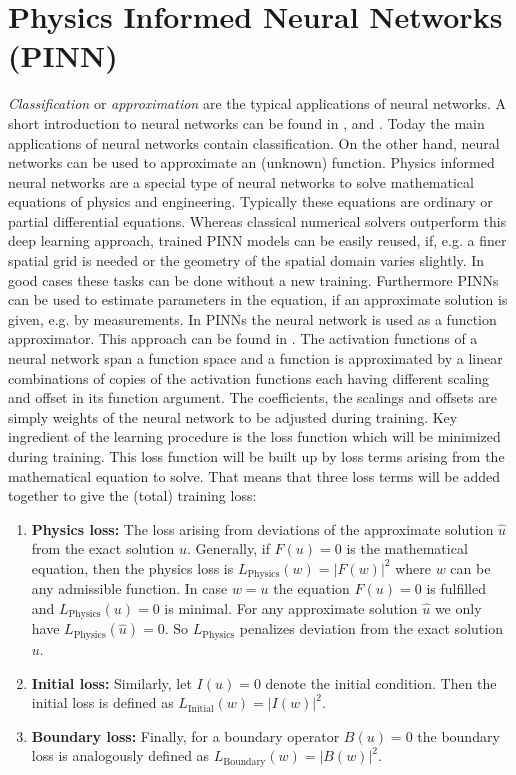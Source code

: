 \documentclass[a4paper,11pt]{article}
\begin{document}
\section{Physics Informed Neural Networks (PINN)}
\emph{Classification} or \emph{approximation} are the typical applications of neural networks. A short introduction to neural networks can be found in \cite[pp. 809]{stoecker1995formeln}, \cite{rey2011neuralnetworks} and \cite{rojas1993neuronale}. Today the main applications of neural networks contain classification. On the other hand, neural networks can be used to approximate an (unknown) function. Physics informed neural networks are a special type of neural networks to solve mathematical equations of physics and engineering. Typically these equations are ordinary or partial differential equations. Whereas classical numerical solvers outperform this deep learning approach, trained PINN models can be easily reused, if, e.g. a finer spatial grid is needed or the geometry of the spatial domain varies slightly. In good cases these tasks can be done without a new training. Furthermore PINNs can be used to estimate parameters in the equation, if an approximate solution is given, e.g. by measurements. In PINNs the neural network is used as a function approximator. This approach can be found in \cite[Section 3.2]{lopez2008}. The activation functions of a neural network span a function space and a function is approximated by a linear combinations of copies of the activation functions each having different scaling and offset in its function argument. The coefficients, the scalings and offsets are simply weights of the neural network to be adjusted during training. Key ingredient of the learning procedure is the loss function which will be minimized during training. This loss function will be built up by loss terms arising from the mathematical equation to solve.
That means that three loss terms will be added together to give the (total) training loss:
\begin{enumerate}
\item {\bf Physics loss:} The loss arising from deviations of the approximate solution $\hat{u}$ from the exact solution $u$. Generally, if $F(u) = 0$ is the mathematical equation, then the physics loss is $L_{\mathrm{Physics}} (w) = |F(w)|^2 $ where $w$ can be any admissible function. In case $w=u$ the equation $F(u) = 0$ is fulfilled and $L_{\mathrm{Physics}} (u) = 0 $ is minimal. For any approximate solution $\hat{u} $ we only have $L_{\mathrm{Physics}} (\hat{u}) = 0 $. So $L_{\mathrm{Physics}} $ penalizes deviation from the exact solution $u$.
\item {\bf Initial loss:} Similarly, let $I(u) = 0$ denote the initial condition. Then the initial loss is defined as $L_{\mathrm{Initial}} (w) = |I(w)|^2 $.
\item {\bf Boundary loss:} Finally, for a boundary operator $B(u) =0 $ the boundary loss is analogously defined as $L_{\mathrm{Boundary}} (w) = |B(w)|^2 $.
\end{enumerate}
\end{document}
